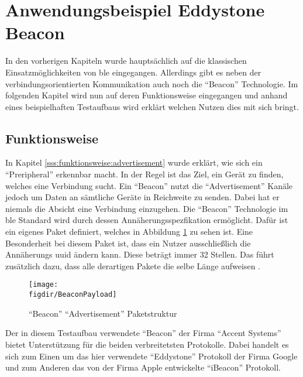 \section{Anwendungsbeispiel Eddystone Beacon}
\label{s:ibeacon}

In den vorherigen Kapiteln wurde hauptsächlich auf die klassischen Einsatzmöglichkeiten von \ac{ble} eingegangen. Allerdings gibt es neben der verbindungsorientierten Kommunikation auch noch die "`Beacon"' Technologie. Im folgenden Kapitel wird nun auf deren Funktionsweise eingegangen und anhand eines beispielhaften Testaufbaus wird erklärt welchen Nutzen dies mit sich bringt.\\   

\subsection{Funktionsweise}
\label{ss:ibeacon:funktionsweise}

In Kapitel \ref{sss:funktionsweise:advertisement} wurde erklärt, wie sich ein "`Preripheral"' erkennbar macht. In der Regel ist das Ziel, ein Gerät zu finden, welches eine Verbindung sucht. Ein "`Beacon"' nutzt die "`Advertisement"' Kanäle jedoch um Daten an sämtliche Geräte in Reichweite zu senden. Dabei hat er niemals die Absicht eine Verbindung einzugehen. Die "`Beacon"' Technologie im \ac{ble} Standard wird durch dessen Annäherungsspezfikation ermöglicht. Dafür ist ein eigenes Paket definiert, welches in Abbildung \ref{FIG:beaconPayload} zu sehen ist. Eine Besonderheit bei diesem Paket ist, dass ein Nutzer ausschließlich die Annäherungs \ac{uuid} ändern kann. Diese beträgt immer 32 Stellen. Das führt zusätzlich dazu, dass alle derartigen Pakete die selbe Länge aufweisen \cite[Seite 16]{Gast14:BPA}.\\

\begin{figure}[h]
	\centering
	\texttt{[image: \\figdir/BeaconPayload]}
	\caption{"`Beacon"' "`Advertisement"' Paketstruktur \cite[Seite 16]{Gast14:BPA}}
	\label{FIG:beaconPayload}
\end{figure}

\noindent Der in diesem Testaufbau verwendete "`Beacon"' der Firma "`Accent Systems"' bietet Unterstützung für die beiden verbreitetsten Protokolle. Dabei handelt es sich zum Einen um das hier verwendete "`Eddystone"' Protokoll der Firma Google und zum Anderen das von der Firma Apple entwickelte "`iBeacon"' Protokoll.\\ 

